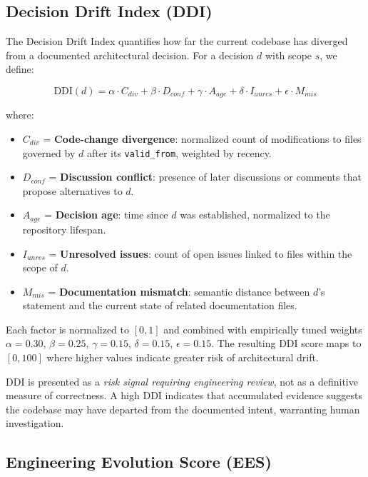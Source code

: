 \documentclass[conference]{IEEEtran}
\begin{document}
\subsection{Decision Drift Index (DDI)}

The Decision Drift Index quantifies how far the current codebase has diverged from a documented architectural decision. For a decision $d$ with scope $s$, we define:

\begin{equation}
\text{DDI}(d) = \alpha \cdot C_{div} + \beta \cdot D_{conf} + \gamma \cdot A_{age} + \delta \cdot I_{unres} + \epsilon \cdot M_{mis}
\end{equation}

where:
\begin{itemize}
    \item $C_{div}$ = \textbf{Code-change divergence}: normalized count of modifications to files governed by $d$ after its \texttt{valid\_from}, weighted by recency.
    \item $D_{conf}$ = \textbf{Discussion conflict}: presence of later discussions or comments that propose alternatives to $d$.
    \item $A_{age}$ = \textbf{Decision age}: time since $d$ was established, normalized to the repository lifespan.
    \item $I_{unres}$ = \textbf{Unresolved issues}: count of open issues linked to files within the scope of $d$.
    \item $M_{mis}$ = \textbf{Documentation mismatch}: semantic distance between $d$'s statement and the current state of related documentation files.
\end{itemize}

Each factor is normalized to $[0, 1]$ and combined with empirically tuned weights $\alpha = 0.30$, $\beta = 0.25$, $\gamma = 0.15$, $\delta = 0.15$, $\epsilon = 0.15$. The resulting DDI score maps to $[0, 100]$ where higher values indicate greater risk of architectural drift.

DDI is presented as a \emph{risk signal requiring engineering review}, not as a definitive measure of correctness. A high DDI indicates that accumulated evidence suggests the codebase may have departed from the documented intent, warranting human investigation.

\subsection{Engineering Evolution Score (EES)}
\end{document}
